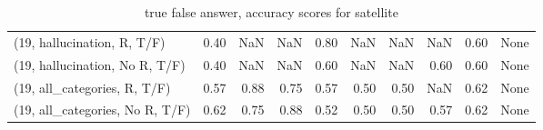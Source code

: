 \begin{table*}[h!]
\begin{adjustbox}{width=2\columnwidth,center}
\begin{tabular}{lrrr|rrr|rrr}
(19, hallucination, R, T/F)           &                      0.40 &                   NaN &                       NaN &                          0.80 &                       NaN &                           NaN &                                    NaN &                               0.60 &                                  None \\
(19, hallucination, No R, T/F)        &                      0.40 &                   NaN &                       NaN &                          0.60 &                       NaN &                           NaN &                                   0.60 &                               0.60 &                                  None \\
(19, all\_categories, R, T/F)          &                      0.57 &                  0.88 &                      0.75 &                          0.57 &                      0.50 &                          0.50 &                                    NaN &                               0.62 &                                  None \\
(19, all\_categories, No R, T/F)       &                      0.62 &                  0.75 &                      0.88 &                          0.52 &                      0.50 &                          0.50 &                                   0.57 &                               0.62 &                                  None \\


\bottomrule
\end{tabular}
\end{adjustbox}
\caption{true false answer, accuracy scores for satellite}
\end{table*}